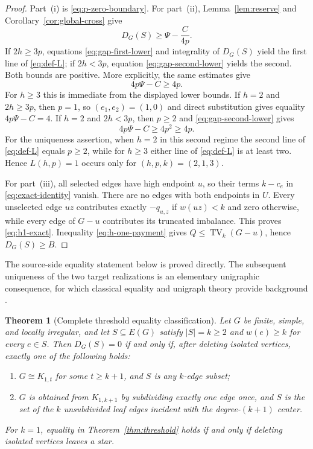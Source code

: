 \documentclass[a4paper,11pt]{amsart}
\numberwithin{equation}{section}
\newtheorem{theorem}{Theorem}[section]
\theoremstyle{definition}
\theoremstyle{remark}
\newcommand{\TV}{\operatorname{TV}}
\begin{document}
\begin{proof}
Part~(i) is \eqref{eq:p-zero-boundary}.  For part~(ii), Lemma~\ref{lem:reserve} and Corollary~\ref{cor:global-cross} give
\[
D_G(S)\ge\Psi-\frac{C}{4p}.
\]
If $2h\ge3p$, equations \eqref{eq:gap-first-lower} and integrality of $D_G(S)$ yield the first line of \eqref{eq:def-L}; if $2h<3p$, equation \eqref{eq:gap-second-lower} yields the second.  Both bounds are positive.  More explicitly, the same estimates give
\begin{equation}
4p\Psi-C\ge4p.
\label{eq:integral-gap}
\end{equation}
For $h\ge3$ this is immediate from the displayed lower bounds.  If $h=2$ and $2h\ge3p$, then $p=1$, so $(e_1,e_2)=(1,0)$ and direct substitution gives equality $4p\Psi-C=4$.  If $h=2$ and $2h<3p$, then $p\ge2$ and \eqref{eq:gap-second-lower} gives
\[
4p\Psi-C\ge4p^2\ge4p.
\]
For the uniqueness assertion, when $h=2$ in this second regime the second line of \eqref{eq:def-L} equals $p\ge2$, while for $h\ge3$ either line of \eqref{eq:def-L} is at least two.  Hence $L(h,p)=1$ occurs only for $(h,p,k)=(2,1,3)$.

For part~(iii), all selected edges have high endpoint $u$, so their terms $k-c_e$ in \eqref{eq:exact-identity} vanish.  There are no edges with both endpoints in $U$.  Every unselected edge $uz$ contributes exactly $-q_{u,z}$ if $w(uz)<k$ and zero otherwise, while every edge of $G-u$ contributes its truncated imbalance.  This proves \eqref{eq:h1-exact}.  Inequality \eqref{eq:h-one-payment} gives $Q\le\TV_k(G-u)$, hence $D_G(S)\ge B$.
\end{proof}

The source-side equality statement below is proved directly.  The subsequent uniqueness of the two target realizations is an elementary unigraphic consequence, for which classical equality and unigraph theory provide background \cite{Tyshkevich2000,Barrus2013}.

\begin{theorem}[Complete threshold equality classification]\label{thm:equality-classification}
Let $G$ be finite, simple, and locally irregular, and let $S\subseteq E(G)$ satisfy $\lvert S\rvert=k\ge2$ and $w(e)\ge k$ for every $e\in S$.  Then $D_G(S)=0$ if and only if, after deleting isolated vertices, exactly one of the following holds:
\begin{enumerate}[label=\textup{(\alph*)}]
\item $G\cong K_{1,t}$ for some $t\ge k+1$, and $S$ is any $k$-edge subset;
\item $G$ is obtained from $K_{1,k+1}$ by subdividing exactly one edge once, and $S$ is the set of the $k$ unsubdivided leaf edges incident with the degree-$(k+1)$ center.
\end{enumerate}
For $k=1$, equality in Theorem~\ref{thm:threshold} holds if and only if deleting isolated vertices leaves a star.
\end{theorem}
\end{document}
